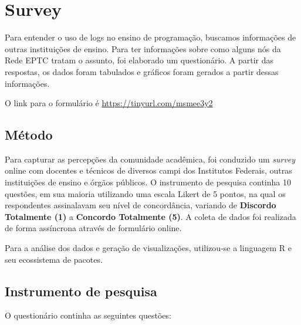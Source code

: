 \chapter{Survey}

Para entender o uso de logs no ensino de programação, buscamos informações de outras instituições de ensino. Para ter informações sobre como alguns nós da Rede EPTC tratam o assunto, foi elaborado um questionário. A partir das respostas, os dados foram tabulados e gráficos foram gerados a partir dessas informações. 

O link para o formulário é \url{https://tinyurl.com/msmee3y2} 

%

\section{Método}

Para capturar as percepções da comunidade acadêmica, foi conduzido um \textit{survey} online com docentes e técnicos de diversos campi dos Institutos Federais, outras instituições de ensino e órgãos públicos. O instrumento de pesquisa continha 10 questões, em sua maioria utilizando uma escala Likert de 5 pontos, na qual os respondentes assinalavam seu nível de concordância, variando de \textbf{Discordo Totalmente (1)} a \textbf{Concordo Totalmente (5)}. A coleta de dados foi realizada de forma assíncrona através de formulário online.

Para a análise dos dados e geração de visualizações, utilizou-se a linguagem R e seu ecossistema de pacotes.

\section{Instrumento de pesquisa}
O questionário continha as seguintes questões:

